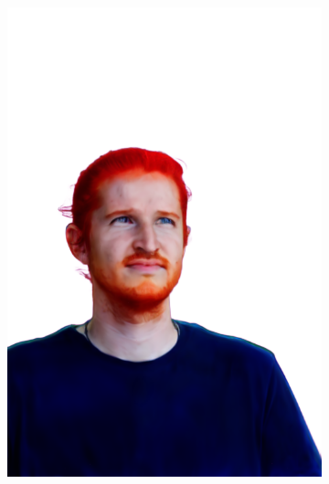 \begin{figure}[ht]
\begin{subfigure}{0.08\linewidth}
        \includegraphics[width=\textwidth]{Figures/results/low/ephra_red/11_render.png}

\end{subfigure}
\end{figure}
